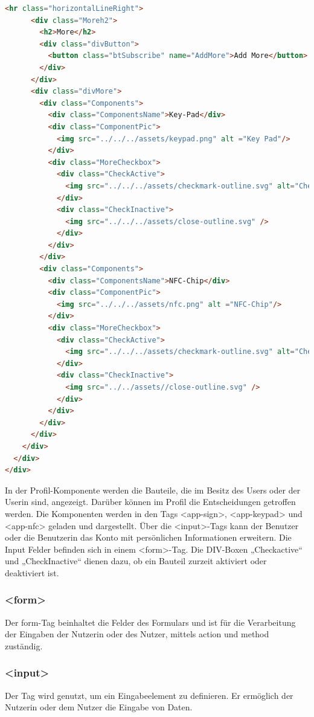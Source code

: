 \begin{lstlisting}[language=html, caption=Profil Komponente]
      <hr class="horizontalLineRight">
      <div class="Moreh2">
        <h2>More</h2>
        <div class="divButton">
          <button class="btSubscribe" name="AddMore">Add More</button>
        </div>
      </div>
      <div class="divMore">
        <div class="Components">
          <div class="ComponentsName">Key-Pad</div>
          <div class="ComponentPic">
            <img src="../../../assets/keypad.png" alt ="Key Pad"/>
          </div>
          <div class="MoreCheckbox">
            <div class="CheckActive">
              <img src="../../../assets/checkmark-outline.svg" alt="Checkmark" />
            </div>
            <div class="CheckInactive">
              <img src="../../../assets/close-outline.svg" />
            </div>
          </div>
        </div>
        <div class="Components">
          <div class="ComponentsName">NFC-Chip</div>
          <div class="ComponentPic">
            <img src="../../../assets/nfc.png" alt ="NFC-Chip"/>
          </div>
          <div class="MoreCheckbox">
            <div class="CheckActive">
              <img src="../../../assets/checkmark-outline.svg" alt="Checkmark" />
            </div>
            <div class="CheckInactive">
              <img src="../../assets//close-outline.svg" />
            </div>
          </div>
        </div>
      </div>
    </div>
  </div>
</div>
\end{lstlisting}

In der Profil-Komponente werden die Bauteile, die im Besitz des Users oder der Userin sind, angezeigt. Darüber können im Profil die Entscheidungen getroffen werden. Die Komponenten werden in den Tags <app-sign>, <app-keypad> und <app-nfc> geladen und dargestellt. Über die <input>-Tags kann der Benutzer oder die Benutzerin das Konto mit persönlichen Informationen erweitern. Die Input Felder befinden sich in einem <form>-Tag. Die DIV-Boxen „Checkactive“ und „CheckInactive“ dienen dazu, ob ein Bauteil zurzeit aktiviert oder deaktiviert ist.

\subsubsection{<form>}
Der form-Tag beinhaltet die Felder des Formulars und ist für die Verarbeitung der Eingaben der Nutzerin oder des Nutzer, mittels action und method zuständig.
\cite{Form}

\subsubsection{<input>}
Der Tag wird genutzt, um ein Eingabeelement zu definieren. Er ermöglich der Nutzerin oder dem Nutzer die Eingabe von Daten.
\cite{InputTag}


